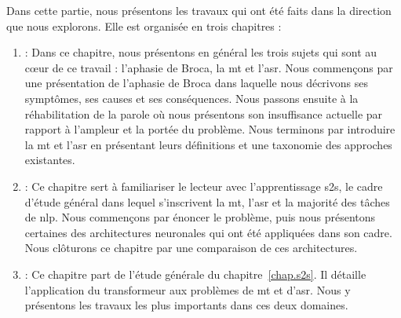 Dans cette partie, nous présentons les travaux qui ont été faits dans la direction que nous explorons.
Elle est organisée en trois chapitres :
\begin{enumerate}[label={Chapitre \arabic*}]
    \item {} :    
    Dans ce chapitre, nous présentons en général les trois sujets qui sont au cœur de ce travail :
    l'aphasie de Broca, la \gls{mt} et l'\gls{asr}.
    Nous commençons par une présentation de l'aphasie de Broca 
    dans laquelle nous décrivons ses symptômes, ses causes et ses conséquences.
    Nous passons ensuite à la réhabilitation de la parole où nous présentons son insuffisance actuelle
    par rapport à l'ampleur et la portée du problème.
    Nous terminons par introduire la \gls{mt} et l'\gls{asr} 
    en présentant leurs définitions et une taxonomie des approches existantes.
    
    \item {} :
    Ce chapitre sert à familiariser le lecteur avec l'apprentissage \gls{s2s},
    le cadre d'étude général dans lequel s'inscrivent la \gls{mt}, l'\gls{asr} et la majorité des tâches de \gls{nlp}.
    Nous commençons par énoncer le problème, 
    puis nous présentons certaines des architectures neuronales qui ont été appliquées dans son cadre.
    Nous clôturons ce chapitre par une comparaison de ces architectures.
    
    \item {} :    
    Ce chapitre part de l'étude générale du chapitre~\ref{chap.s2s}.
    Il détaille l'application du transformeur aux problèmes de \gls{mt} et d'\gls{asr}.
    Nous y présentons les travaux les plus importants dans ces deux domaines.
\end{enumerate}

\subsection*{}

